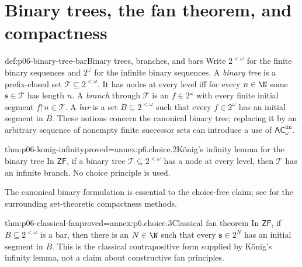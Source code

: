 \section[Binary-tree compactness]{Binary trees, the fan theorem, and compactness}

\begin{hbdefinition}{def:p06-binary-tree-bar}{Binary trees, branches, and bars}
Write \(2^{<\omega}\) for the finite binary sequences and \(2^\omega\) for
the infinite binary sequences.  A \emph{binary tree} is a prefix-closed set
\(\mathcal T\subseteq2^{<\omega}\).  It has nodes at every level iff for every
\(n\in\N\) some \(\mathbf s\in\mathcal T\) has length \(n\).  A \emph{branch} through
\(\mathcal T\) is an \(f\in2^\omega\) with every finite initial segment
\(f\mathord{\upharpoonright}n\in\mathcal T\).  A \emph{bar} is a set
\(B\subseteq2^{<\omega}\) such that every \(f\in2^\omega\) has an initial
segment in \(B\).  These notions concern the canonical binary tree; replacing
it by an arbitrary sequence of nonempty finite successor sets can introduce a
use of \(\mathsf{AC}_{\omega}^{\mathrm{fin}}\).
\end{hbdefinition}

\begin{hbtheorem}{thm:p06-konig-infinity}{proved=annex:p6.choice.2}{K\"onig's infinity lemma for the binary tree}
In \(\mathsf{ZF}\), if a binary tree \(\mathcal T\subseteq2^{<\omega}\) has a
node at every level, then \(\mathcal T\) has an infinite branch.  No choice
principle is used.
\end{hbtheorem}
The canonical binary formulation is essential to the choice-free claim; see
\cite{Jech2003} for the surrounding set-theoretic compactness methods.

\begin{hbcorollary}{thm:p06-classical-fan}{proved=annex:p6.choice.3}{Classical fan theorem}
In \(\mathsf{ZF}\), if \(B\subseteq2^{<\omega}\) is a bar, then there is an
\(N\in\N\) such that every \(\mathbf s\in2^N\) has an initial segment in \(B\).
This is the classical contrapositive form supplied by K\"onig's infinity
lemma, not a claim about constructive fan principles.
\end{hbcorollary}

